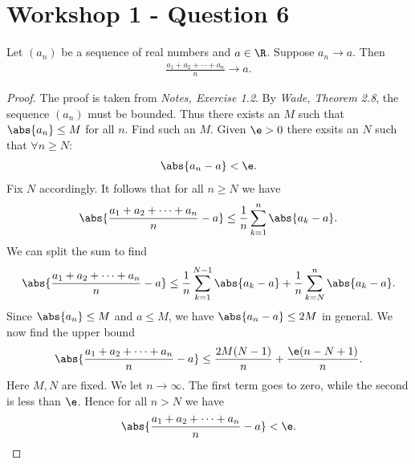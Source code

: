 \documentclass{article}
\begin{document}
\section{Workshop 1 - Question 6}

\begin{claim}
   Let $(a_n)$ be a sequence of real numbers and $a\in\R$. Suppose
   $a_n\to a$. Then
   \begin{align*}
      \frac{a_1 + a_2 + \cdots + a_n}{n}\to a.
   \end{align*}
   \begin{proof}
      The proof is taken from \emph{Notes, Exercise 1.2}.
      By \emph{Wade, Theorem 2.8}, the sequence $(a_n)$ must be bounded.
      Thus there exists an $M$ such that $\abs{a_n}\leq M$ for all $n$.
      Find such an $M$.
      Given $\e > 0$ there exsits an $N$ such that $\forall n \geq N$:
      \begin{align*}
         \abs{a_n - a} < \e.
      \end{align*}
      Fix $N$ accordingly. It follows that for all $n\geq N$ we have
      \begin{align*}
         \abs{\frac{a_1 + a_2 + \cdots + a_n}{n}-a} \leq
         \frac{1}{n}\sum_{k=1}^n \abs{a_k - a}.
      \end{align*}
      We can split the sum to find
      \begin{align*}
         \abs{\frac{a_1 + a_2 + \cdots + a_n}{n}-a} \leq
         \frac{1}{n}\sum_{k=1}^{N-1} \abs{a_k - a} + \frac{1}{n}\sum_{k=N}^n \abs{a_k-a}.
      \end{align*}
      Since $\abs{a_n}\leq M$ and $a\leq M$, we have $\abs{a_n-a}\leq 2M$ in general.
      We now find the upper bound
      \begin{align*}
         \abs{\frac{a_1 + a_2 + \cdots + a_n}{n}-a} \leq
         \frac{2M(N-1)}{n} + \frac{\e(n-N+1)}{n}.
      \end{align*}
      Here $M,N$ are fixed. We let $n\to\infty$. The first term goes to zero, while
      the second is less than $\e$. Hence for all $n>N$ we have
      \begin{align*}
         \abs{\frac{a_1 + a_2 + \cdots + a_n}{n}-a} < \e.
      \end{align*}
   \end{proof}
\end{claim}
\end{document}
